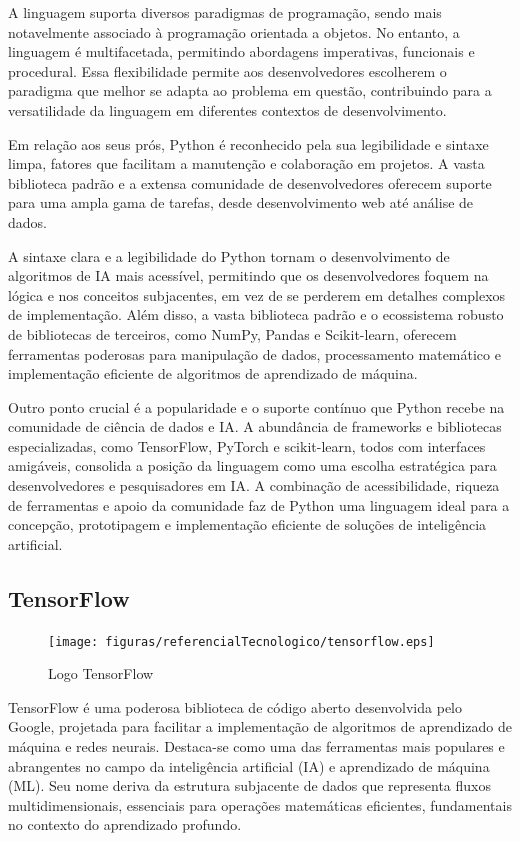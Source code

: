 A linguagem suporta diversos paradigmas de programação, sendo mais notavelmente associado à programação orientada a objetos. No entanto, a linguagem é multifacetada, permitindo abordagens imperativas, funcionais e procedural. Essa flexibilidade permite aos desenvolvedores escolherem o paradigma que melhor se adapta ao problema em questão, contribuindo para a versatilidade da linguagem em diferentes contextos de desenvolvimento.

Em relação aos seus prós, Python é reconhecido pela sua legibilidade e sintaxe limpa, fatores que facilitam a manutenção e colaboração em projetos. A vasta biblioteca padrão e a extensa comunidade de desenvolvedores oferecem suporte para uma ampla gama de tarefas, desde desenvolvimento web até análise de dados.

A sintaxe clara e a legibilidade do Python tornam o desenvolvimento de algoritmos de IA mais acessível, permitindo que os desenvolvedores foquem na lógica e nos conceitos subjacentes, em vez de se perderem em detalhes complexos de implementação. Além disso, a vasta biblioteca padrão e o ecossistema robusto de bibliotecas de terceiros, como NumPy, Pandas e Scikit-learn, oferecem ferramentas poderosas para manipulação de dados, processamento matemático e implementação eficiente de algoritmos de aprendizado de máquina.

Outro ponto crucial é a popularidade e o suporte contínuo que Python recebe na comunidade de ciência de dados e IA. A abundância de frameworks e bibliotecas especializadas, como TensorFlow, PyTorch e scikit-learn, todos com interfaces amigáveis, consolida a posição da linguagem como uma escolha estratégica para desenvolvedores e pesquisadores em IA. A combinação de acessibilidade, riqueza de ferramentas e apoio da comunidade faz de Python uma linguagem ideal para a concepção, prototipagem e implementação eficiente de soluções de inteligência artificial.

\subsection{TensorFlow}

\begin{figure}[ht]
	\centering
	\texttt{[image: figuras/referencialTecnologico/tensorflow.eps]}
	\caption{Logo TensorFlow}
	\label{fig:tensorflow}
\end{figure}

TensorFlow é uma poderosa biblioteca de código aberto desenvolvida pelo Google, projetada para facilitar a implementação de algoritmos de aprendizado de máquina e redes neurais. Destaca-se como uma das ferramentas mais populares e abrangentes no campo da inteligência artificial (IA) e aprendizado de máquina (ML). Seu nome deriva da estrutura subjacente de dados que representa fluxos multidimensionais, essenciais para operações matemáticas eficientes, fundamentais no contexto do aprendizado profundo.

